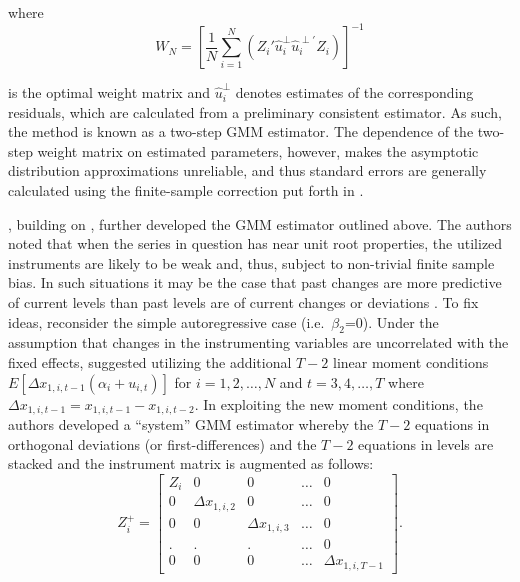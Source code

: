 \documentclass[english]{article}
\begin{document}
\noindent
where
\begin{equation}
W_N = \left[\frac{1}{N}\sum_{i=1}^N \left(Z_i' \widehat{u}_i^\perp \widehat{u}_i^{\perp \prime} Z_i \right)  \right]^{-1}
\end{equation}

\noindent
is the optimal weight matrix and $\widehat{u}_i^\perp$ denotes estimates of the corresponding residuals, which are calculated from a preliminary consistent estimator. As such, the method is known as a two-step GMM estimator. The dependence of the two-step weight matrix on estimated parameters, however, makes the asymptotic distribution approximations unreliable, and thus standard errors are generally calculated using the finite-sample correction put forth in \citet{windmeijer2005} \citep{arellano1991, bond2002, roodman2009}.

\citet{blundell1998}, building on \citet{arellano1995}, further developed the GMM estimator outlined above. The authors noted that when the series in question has near unit root properties, the utilized instruments are likely to be weak and, thus, subject to non-trivial finite sample bias. In such situations it may be the case that past changes are more predictive of current levels than past levels are of current changes or deviations \citep{roodman2009}. To fix ideas, reconsider the simple autoregressive case (i.e.\ $\beta_2$=0). Under the assumption that changes in the instrumenting variables are uncorrelated with the fixed effects, \citeauthor{blundell1998} suggested utilizing the additional $T-2$ linear moment conditions $E[\Delta x_{1,i,t-1} (\alpha_i + u_{i,t})]$ for $i=1,2,\ldots,N$ and $t=3,4,\ldots,T$ where $\Delta x_{1,i,t-1} = x_{1,i,t-1} - x_{1,i,t-2}$. In exploiting the new moment conditions, the authors developed a ``system'' GMM estimator whereby the $T-2$ equations in orthogonal deviations (or first-differences) and the $T-2$ equations in levels are stacked and the instrument matrix is augmented as follows:
\begin{equation}
Z_{i}^{+} = \left[ 
\begin{array}{ccccccc}
Z_i  & 0 & 0 & \ldots & 0\\
0 & \Delta x_{1,i,2} & 0 & \ldots & 0 \\
0 & 0 & \Delta x_{1,i,3} & \ldots & 0 \\
. & . & . & \ldots & 0 \\
0 & 0 & 0 & \ldots & \Delta x_{1,i,T-1}
\end{array}
\right].
\label{znew}
\end{equation}
\end{document}
